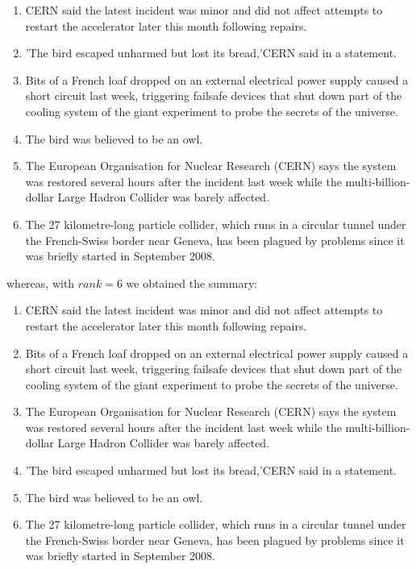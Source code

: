 \begin{enumerate}
	\item CERN said the latest incident was minor and did not affect attempts to restart the accelerator later this month following repairs.
	\item 'The bird escaped unharmed but lost its bread,'CERN said in a statement.
	\item Bits of a French loaf dropped on an external electrical power supply caused a short circuit last week, triggering failsafe devices that shut down part of the cooling system of the giant experiment to probe the secrets of the universe.
	\item The bird was believed to be an owl.
	\item The European Organisation for Nuclear Research (CERN) says the system was restored several hours after the incident last week while the multi-billion-dollar Large Hadron Collider was barely affected.
	\item The 27 kilometre-long particle collider, which runs in a circular tunnel under the French-Swiss border near Geneva, has been plagued by problems since it was briefly started in September 2008.
\end{enumerate}
whereas, with $rank=6$ we obtained the summary:
\begin{enumerate}
	\item CERN said the latest incident was minor and did not affect attempts to restart the accelerator later this month following repairs.
	\item Bits of a French loaf dropped on an external electrical power supply caused a short circuit last week, triggering failsafe devices that shut down part of the cooling system of the giant experiment to probe the secrets of the universe.
	\item The European Organisation for Nuclear Research (CERN) says the system was restored several hours after the incident last week while the multi-billion-dollar Large Hadron Collider was barely affected.
	\item 'The bird escaped unharmed but lost its bread,'CERN said in a statement. 
	\item The bird was believed to be an owl.
	\item The 27 kilometre-long particle collider, which runs in a circular tunnel under the French-Swiss border near Geneva, has been plagued by problems since it was briefly started in September 2008.
\end{enumerate}

